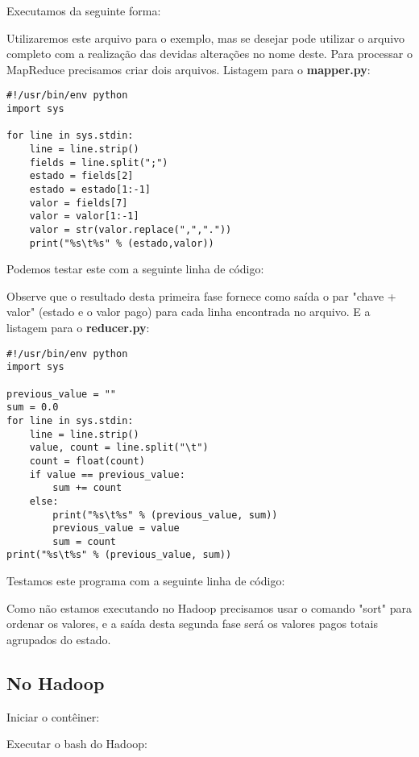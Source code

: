 \documentclass[a4paper,11pt]{article}
\begin{document}
Executamos da seguinte forma: \\

Utilizaremos este arquivo para o exemplo, mas se desejar pode utilizar o arquivo completo com a realização das devidas alterações no nome deste. Para processar o MapReduce precisamos criar dois arquivos. Listagem para o \textbf{mapper.py}:
\begin{lstlisting}[]
#!/usr/bin/env python
import sys

for line in sys.stdin:
	line = line.strip()
	fields = line.split(";")
	estado = fields[2]
	estado = estado[1:-1]
	valor = fields[7]
	valor = valor[1:-1]
	valor = str(valor.replace(",","."))
	print("%s\t%s" % (estado,valor))
\end{lstlisting}

Podemos testar este com a seguinte linha de código: \\

Observe que o resultado desta primeira fase fornece como saída o par "chave + valor" (estado e o valor pago) para cada linha encontrada no arquivo. E a listagem para o \textbf{reducer.py}:
\begin{lstlisting}[]
#!/usr/bin/env python
import sys

previous_value = ""
sum = 0.0
for line in sys.stdin:
	line = line.strip()
	value, count = line.split("\t")
	count = float(count)
	if value == previous_value:
		sum += count
	else:
		print("%s\t%s" % (previous_value, sum))
		previous_value = value
		sum = count
print("%s\t%s" % (previous_value, sum))
\end{lstlisting}

Testamos este programa com a seguinte linha de código: \\

Como não estamos executando no Hadoop precisamos usar o comando "sort" para ordenar os valores, e a saída desta segunda fase será os valores pagos totais agrupados do estado.

\subsection{No Hadoop}
Iniciar o contêiner: \\

Executar o bash do Hadoop: \\
\end{document}
